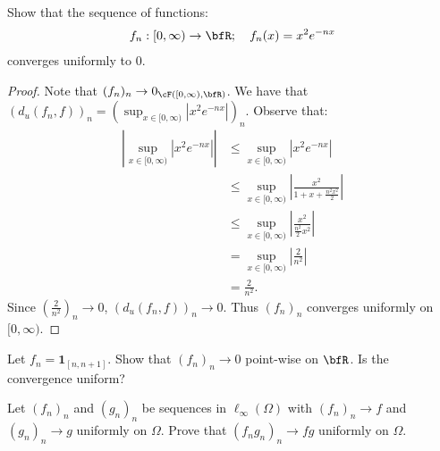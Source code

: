 \documentclass[10pt,twoside,openany]{memoir}
\begin{document}
    \begin{exercise}
        Show that the sequence of functions:
            \begin{equation*}
            \begin{split}
                f_n: [0,\infty) \rightarrow \bfR; \hspace{10pt}f_n(x)=x^2e^{-nx}
            \end{split}
            \end{equation*}
        converges uniformly to $0$.
    \end{exercise}
        \begin{proof}
            Note that $(f_n)_n \rightarrow 0_{\cF\left([0,\infty),\bfR\right)}$. We have that $(d_u(f_n,f))_n = \left(\sup_{x \in [0,\infty)} \left|x^2 e^{-nx}\right|\right)_n$. Observe that:
                \begin{equation*}
                \begin{split}
                    \left|\sup_{x \in [0,\infty)} \left|x^2 e^{-nx}\right|\right|
                    & \leq \sup_{x \in [0,\infty)} |x^2 e^{-nx}| \\
                    & \leq \sup_{x \in [0,\infty)} \left|\frac{x^2}{1+x+\frac{n^2x^2}{2}}\right| \\ 
                    & \leq \sup_{x \in [0,\infty)} \left|\frac{x^2}{\frac{n^2}{2} x^2}\right| \\
                    &= \sup_{x \in [0,\infty)} \left|\frac{2}{n^2}\right| \\
                    & = \frac{2}{n^2}.
                \end{split}
                \end{equation*}
            Since $\left(\frac{2}{n^2}\right)_n \rightarrow 0$, $(d_u(f_n,f))_n \rightarrow 0$. Thus $(f_n)_n$ converges uniformly on $[0,\infty)$.
        \end{proof}
    \begin{exercise}
        Let $f_n = \mathbf{1}_{[n,n+1]}$. Show that $(f_n)_n \rightarrow 0$ point-wise on $\bfR$. Is the convergence uniform?
    \end{exercise}
    \begin{exercise}
        Let $(f_n)_n$ and $(g_n)_n$ be sequences in $\ell_\infty(\Omega)$ with $(f_n)_n \rightarrow f$ and $(g_n)_n \rightarrow g$ uniformly on $\Omega$. Prove that $(f_n g_n)_n \rightarrow fg$ uniformly on $\Omega$.
    \end{exercise}
\end{document}

